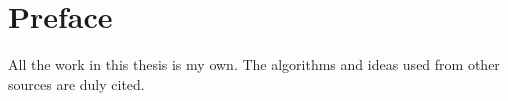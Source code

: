 
\chapter{Preface}

All the work in this thesis is my own. The algorithms and ideas used from other sources are duly cited.
